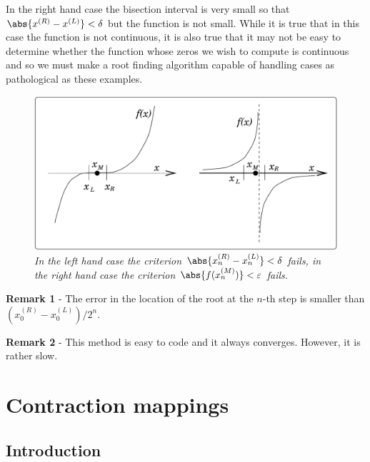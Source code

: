 In the right hand case the bisection interval is very small so that
$\abs{x^{(R)} - x^{(L)}} < \delta$ but the function is not small.  While
it is true that in this case the function is not continuous, it is
also true that it may not be easy to determine whether the function
whose zeros we wish to compute is continuous and so we must make a
root finding algorithm capable of handling cases as pathological as
these examples.

\begin{figure}
  \centerline{\includegraphics[width=120mm]{figures/bisec_stop}}
  \caption{\label{bisec_stop} \it In the left hand case the criterion
    $\abs{x_n^{(R)}-x_n^{(L)}} < \delta$ fails, in the right hand case the
    criterion $\abs{f(x_n^{(M)})} < \varepsilon$ fails.}
\end{figure}

\noindent
\textbf{Remark 1} - The error in the location of the root at the
$n$-th step is smaller than $(x_0^{(R)}-x_0^{(L)})/2^n$.

\noindent
\textbf{Remark 2} - This method is easy to code and it
always converges.   However, it is rather slow.

\section{Contraction mappings}

\subsection{Introduction}

